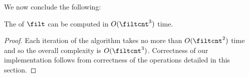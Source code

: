 \bigskip

We now  conclude the following:
\begin{theorem}
    The \hcb{} of $\filt$ can be computed in $O(\filtcnt^3)$ time.
\end{theorem}
\begin{proof}
Each iteration of the algorithm takes no more than $O(\filtcnt^2)$ time
and so
the overall complexity 
is $O(\filtcnt^3)$.
Correctness of our implementation 
follows from 
correctness of the operations detailed in this section.
\end{proof}






